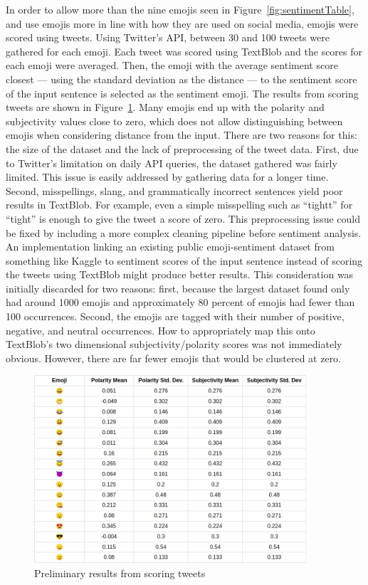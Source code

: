 \documentclass{article}[10]
\begin{document}
In order to allow more than the nine emojis seen in
Figure~{\ref{fig:sentimentTable}}, and use emojis more in line with how they are
used on social media, emojis were scored using tweets. Using Twitter's API,
between 30 and 100 tweets were gathered for each emoji. Each tweet was scored
using TextBlob and the scores for each emoji were averaged. Then, the emoji with
the average sentiment score closest --- using the standard deviation as the
distance --- to the sentiment score of the input sentence is selected as the
sentiment emoji. The results from scoring tweets are shown in
Figure~\ref{fig:tweetScoring}. Many emojis end up with the polarity and
subjectivity values close to zero, which does not allow distinguishing between
emojis when considering distance from the input. There are two reasons for this:
the size of the dataset and the lack of preprocessing of the tweet data. First,
due to Twitter's limitation on daily API queries, the dataset gathered was
fairly limited. This issue is easily addressed by gathering data for a longer
time. Second, misspellings, slang, and grammatically incorrect sentences yield
poor results in TextBlob. For example, even a simple misspelling such as
``tightt'' for ``tight'' is enough to give the tweet a score of zero. This
preprocessing issue could be fixed by including a more complex cleaning pipeline
before sentiment analysis. An implementation linking an existing public
emoji-sentiment dataset from something like Kaggle to sentiment scores of the
input sentence instead of scoring the tweets using TextBlob might produce better
results. This consideration was initially discarded for two reasons: first,
because the largest dataset found only had around 1000 emojis and approximately
80 percent of emojis had fewer than 100 occurrences. Second, the emojis are
tagged with their number of positive, negative, and neutral occurrences. How to
appropriately map this onto TextBlob's two dimensional subjectivity/polarity
scores was not immediately obvious. However, there are far fewer emojis that
would be clustered at zero.

\begin{figure}[h]
  \begin{center}
    \includegraphics[width=0.90\textwidth]{figures/sentiment_results1.png}
    \caption{Preliminary results from scoring tweets\label{fig:tweetScoring}}
  \end{center}
\end{figure}
\end{document}
